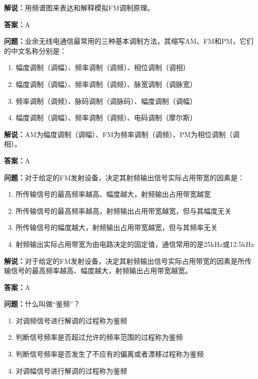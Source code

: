 \documentclass[UTF8]{ctexbook}
\begin{document}
\textbf{解说：}用频谱图来表达和解释模拟FM调制原理。%

\textbf{答案：}A

\textbf{问题：}业余无线电通信最常用的三种基本调制方法，其缩写AM、FM和PM，它们的中文名称分别是：

\begin{enumerate}[label=\Alph*), leftmargin=3em]
  \item 幅度调制（调幅）、频率调制（调频）、相位调制（调相）
  \item 幅度调制（调幅）、频率调制（调频）、脉宽调制（调脉宽）
  \item 频率调制（调频）、脉码调制（调脉码）、幅度调制（调幅）
  \item 幅度调制（调幅）、频率调制（调频）、电码调制（摩尔斯）
\end{enumerate}

\textbf{解说：}AM为幅度调制（调幅）、FM为频率调制（调频）、PM为相位调制（调相）。%

\textbf{答案：}A

\textbf{问题：}对于给定的FM发射设备，决定其射频输出信号实际占用带宽的因素是：

\begin{enumerate}[label=\Alph*), leftmargin=3em]
  \item 所传输信号的最高频率越高、幅度越大，射频输出占用带宽越宽
  \item 所传输信号的最高频率越高，射频输出占用带宽越宽，但与其幅度无关
  \item 所传输信号的幅度越大，射频输出占用带宽越宽，但与其频率无关
  \item 射频输出实际占用带宽为由电路决定的固定值，通信常用的是25kHz或12.5kHz
\end{enumerate}

\textbf{解说：}对于给定的FM发射设备，决定其射频输出信号实际占用带宽的因素是所传输信号的最高频率越高、幅度越大，射频输出占用带宽越宽。%

\textbf{答案：}A

\textbf{问题：}什么叫做“鉴频”？

\begin{enumerate}[label=\Alph*), leftmargin=3em]
  \item 对调频信号进行解调的过程称为鉴频
  \item 判断信号频率是否超过允许的频率范围的过程称为鉴频
  \item 判断信号频率是否发生了不应有的偏离或者漂移过程称为鉴频
  \item 对调幅信号进行解调的过程称为鉴频
\end{enumerate}
\end{document}
